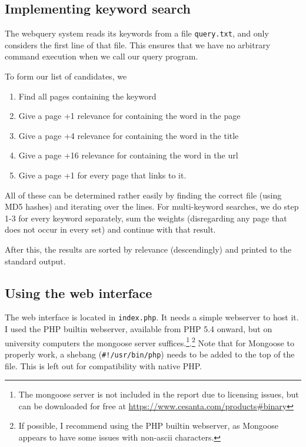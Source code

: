 \documentclass[12pt,a4paper]{article}
\begin{document}
\subsection{Implementing keyword search}

The webquery system reads its keywords from a file \texttt{query.txt}, and only considers the first line of that file. This ensures that we have no arbitrary command execution when we call our query program.

To form our list of candidates, we

\begin{enumerate}
	\item Find all pages containing the keyword
	\item Give a page +1 relevance for containing the word in the page
	\item Give a page +4 relevance for containing the word in the title
	\item Give a page +16 relevance for containing the word in the url
	\item Give a page +1 for every page that links to it.
\end{enumerate}

All of these can be determined rather easily by finding the correct file (using MD5 hashes) and iterating over the lines. For multi-keyword searches, we do step 1-3 for every keyword separately, sum the weights (disregarding any page that does not occur in every set) and continue with that result.

After this, the results are sorted by relevance (descendingly) and printed to the standard output.

\subsection{Using the web interface}

The web interface is located in \texttt{index.php}. It needs a simple webserver to host it. I used the PHP builtin webserver, available from PHP 5.4 onward, but on university computers the mongoose server suffices.\footnote{The mongoose server is not included in the report due to licensing issues, but can be downloaded for free at \url{https://www.cesanta.com/products\#binary}}.\footnote{If possible, I recommend using the PHP builtin webserver, as Mongoose appears to have some issues with non-ascii characters.} Note that for Mongoose to properly work, a shebang (\texttt{\#!/usr/bin/php}) needs to be added to the top of the file. This is left out for compatibility with native PHP.
\end{document}
